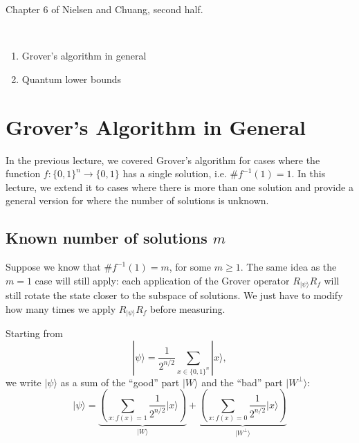 \documentclass{article}
\newcommand{\ket}[1]{|#1\rangle}
\begin{document}
\noindent
{}

\vspace{.3cm}

 Chapter 6 of Nielsen and Chuang, second half. 

\

\begin{enumerate}
     \item Grover's algorithm in general
     \item Quantum lower bounds
\end{enumerate}

\section{Grover's Algorithm in General}

In the previous lecture, we covered Grover's algorithm for cases where the function $f : \{0, 1\}^n \to \{0, 1\}$ has a single solution, i.e. $\# f^{-1}(1) = 1$. In this lecture, we extend it to cases where there is more than one solution and provide a general version for where the number of solutions is unknown.

\subsection{Known number of solutions $m$}

Suppose we know that $\# f^{-1}(1) = m$, for some $m \geq 1$. The same idea as the $m=1$ case will still apply: each application of the Grover operator $R_{\ket{\psi}} R_f$ will still rotate the state closer to the subspace of solutions. We just have to modify how many times we apply $R_{\ket{\psi}} R_f$ before measuring.

Starting from
\[
\ket{\psi} = \frac{1}{2^{n/2}} \sum_{x \in \{0, 1\}^n} \ket{x},
\]
we write $\ket{\psi}$ as a sum of the ``good'' part $\ket{W}$ and the ``bad'' part $\ket{W^{\perp}}$:
\[
\ket{\psi} = \underbrace{\left(\sum_{x : f(x) = 1} \frac{1}{2^{n/2}} \ket{x}\right)}_{\ket{W}} + \underbrace{\left(\sum_{x : f(x) = 0} \frac{1}{2^{n/2}} \ket{x}\right)}_{\ket{W^{\perp}}}
\]
\end{document}
